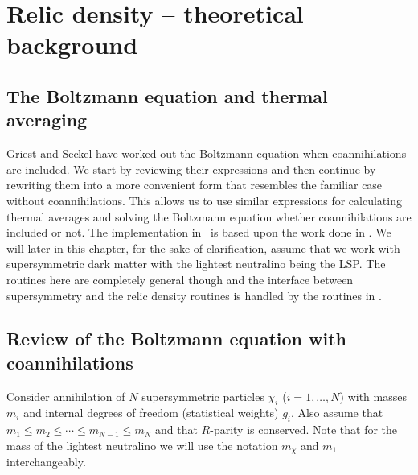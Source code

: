\section{Relic density -- theoretical background}

\subsection{The Boltzmann equation and thermal averaging}
\label{sec:Boltzmann}

Griest and Seckel \cite{GriestSeckel} have worked out the Boltzmann
equation when coannihilations are included. We start by reviewing
their expressions and then continue by rewriting them into a more
convenient form that resembles the familiar case without
coannihilations. This allows us to use similar expressions for
calculating thermal averages and solving the Boltzmann equation
whether coannihilations are included or not. The implementation in
\ds\ is based upon the work done in \cite{edsjo97}. We will later in this
chapter, for the sake of clarification, assume that we work with
supersymmetric dark matter with the lightest neutralino being the
LSP. The routines here are completely general though and the interface
between supersymmetry and the relic density routines is handled by the
routines in .


\subsection{Review of the Boltzmann equation with coannihilations}

Consider annihilation of $N$ supersymmetric particles $\chi_i$
($i=1,\ldots,N$) with masses $m_i$ and internal degrees of freedom
(statistical weights) $g_i$.  Also assume that $m_1 \leq m_2 \leq
\cdots \leq m_{N-1} \leq m_N$ and that $R$-parity is conserved. Note
that for the mass of the lightest neutralino we will use the
notation $m_{\chi}$ and $m_{1}$ interchangeably.

